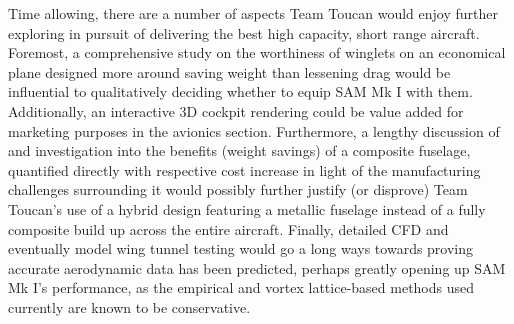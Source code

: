 Time allowing, there are a number of aspects Team Toucan would enjoy further exploring in pursuit of delivering the best high capacity, short range aircraft.  Foremost, a comprehensive study on the worthiness of winglets on an economical plane designed more around saving weight than lessening drag would be influential to qualitatively deciding whether to equip SAM Mk I with them.  Additionally, an interactive 3D cockpit rendering could be value added for marketing purposes in the avionics section.  Furthermore, a lengthy discussion of and investigation into the benefits (weight savings) of a composite fuselage, quantified directly with respective cost increase in light of the manufacturing challenges surrounding it would possibly further justify (or disprove) Team Toucan's use of a hybrid design featuring a metallic fuselage instead of a fully composite build up across the entire aircraft.  Finally, detailed CFD and eventually model wing tunnel testing would go a long ways towards proving accurate aerodynamic data has been predicted, perhaps greatly opening up SAM Mk I's performance, as the empirical and vortex lattice-based methods used currently are known to be conservative.  




